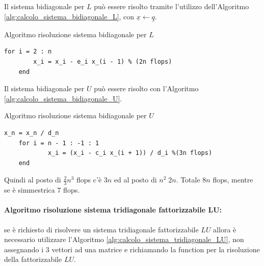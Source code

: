\noindent Il sistema bidiagonale per $L$ può essere risolto tramite l'utilizzo dell'Algoritmo \ref{alg:calcolo_sistema_bidiagonale_L}, con $\underline{x}\leftarrow\underline{q}$.

\begin{algorithm}\caption{Algoritmo risoluzione sistema bidiagonale per $L$}
\label{alg:calcolo_sistema_bidiagonale_L}
    \begin{lstlisting}[style=Matlab-editor]
    for i = 2 : n
        x_i = x_i - e_i x_(i - 1) % (2n flops)
    end
    \end{lstlisting}
\end{algorithm}

\noindent Il sistema bidiagonale per $U$ può essere risolto con l'Algoritmo \ref{alg:calcolo_sistema_bidiagonale_U}.
\begin{algorithm}\caption{Algoritmo risoluzione sistema bidiagonale per $U$}
\label{alg:calcolo_sistema_bidiagonale_U}
    \begin{lstlisting}[style=Matlab-editor]
    x_n = x_n / d_n
    for i = n - 1 : -1 : 1
            x_i = (x_i - c_i x_(i + 1)) / d_i %(3n flops)
    end
    \end{lstlisting}
\end{algorithm}

\noindent Quindi al posto di $\frac{2}{3}n^3$ flops c'è $3n$ ed al posto di $n^2\; 2n$. Totale $8n$ flops, mentre se è simmestrica $7$ flops.

\paragraph{Algoritmo risoluzione sistema tridiagonale fattorizzabile $\boldsymbol{LU}$:} se è richiesto di risolvere un sistema tridiagonale fattorizzabile $LU$ allora è necessario utilizzare l'Algoritmo \ref{alg:calcolo_sistema_tridiagonale_LU}, non assegnando i 3 vettori ad una matrice e richiamando la function per la risoluzione della fattorizzabile $LU$.

